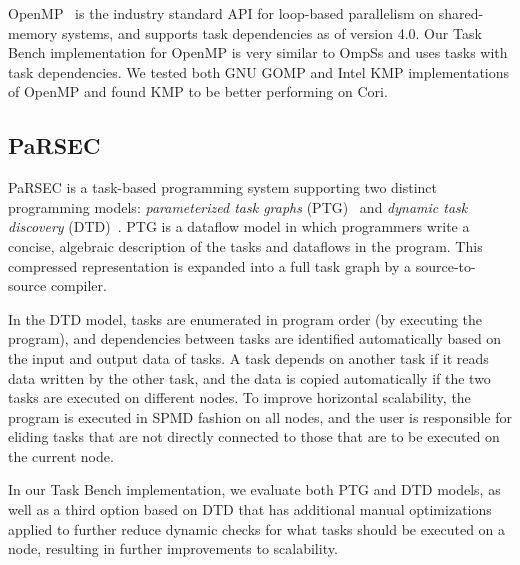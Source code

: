 OpenMP~\cite{OpenMPSpec40} is the industry standard API for loop-based
parallelism on shared-memory systems, and supports task dependencies as of version 4.0. Our Task Bench implementation
for OpenMP is very similar to OmpSs and uses tasks with
task dependencies. We tested both GNU GOMP and Intel KMP
implementations of OpenMP and found KMP to be better performing on Cori.


\subsection{PaRSEC}

PaRSEC is a task-based programming system supporting two distinct
programming models: \emph{parameterized task graphs}
(PTG)~\cite{PARSEC13} and \emph{dynamic task discovery}
(DTD)~\cite{PARSEC_DTD}.  PTG is a dataflow model in which programmers
write a concise, algebraic description of the tasks and dataflows in
the program. This compressed representation is expanded into a full
task graph by a source-to-source compiler.

In the DTD model, tasks are enumerated in program order (by
executing the program), and dependencies between tasks are
identified automatically based on the input and output data of tasks. 
A task depends on another task if it reads data written by the other task,
and the data is copied automatically if the two tasks are executed on
different nodes. To
improve horizontal scalability, the program is executed in
SPMD fashion on all nodes, and the user is responsible for eliding
tasks that are not directly connected to those that are to be executed
on the current node.

In our Task Bench implementation, we evaluate both PTG and DTD models,
as well as a third option based on DTD that has additional manual
optimizations applied to further reduce dynamic checks for what tasks
should be executed on a node, resulting in further improvements to
scalability.


